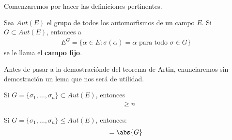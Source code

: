﻿Comenzaremos por hacer las definiciones pertinentes.\par\null

\begin{definicion}
    Sea $Aut(E)$ el grupo de todos los automorfismos de un campo $E$. Si $G \subset Aut(E)$, 
    entonces a
    \begin{align}
        E^G = \{  \alpha \in E : \sigma(\alpha) = \alpha \text{ para todo } \sigma \in G \}
    \end{align}
    se le llama el \textbf{campo fijo}.
\end{definicion}

Antes de pasar a la demostraciónde del teorema de Artin, enunciaremos sin demostración un lema que nos
será de utilidad.

\begin{lema}\label{Artin:lema}
    Si $G = \{ \sigma_1, \dots, \sigma_n \} \subset Aut(E)$, entonces
    \begin{align}
        [E:E^G]     &\geq   n
    \end{align}
\end{lema}\par\null

\begin{teorema}[Artin]
    Si $G=\{ \sigma_1, \dots, \sigma_n \} \leq Aut(E)$, entonces:
    \begin{align}
        [E : E^G]   =   \abs{G}
    \end{align}
\end{teorema}

